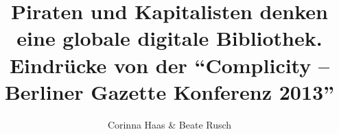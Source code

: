 

\title{\large{Piraten und Kapitalisten denken eine globale digitale Bibliothek. Eindrücke von der \enquote{Complicity – Berliner Gazette Konferenz 2013}}} %
\author{\small{Corinna Haas \& Beate Rusch}} %